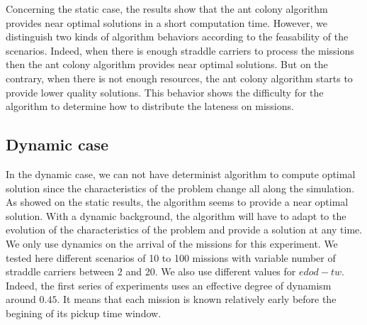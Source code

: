 \documentclass[a4paper,12pt]{article}
\begin{document}
  Concerning the static case, the results show that the ant colony algorithm provides near optimal solutions in a short computation time. However, we distinguish two kinds of algorithm behaviors according to the feasability of the scenarios. Indeed, when there is enough straddle carriers to process the missions then the ant colony algorithm provides near optimal solutions. But on the contrary, when there is not enough resources, the ant colony algorithm starts to provide lower quality solutions. This behavior shows the difficulty for the algorithm to determine how to distribute the lateness on missions.

	\subsection{Dynamic case}
  In the dynamic case, we can not have determinist algorithm to compute optimal solution since the characteristics of the problem change all along the simulation. As showed on the static results, the algorithm seems to provide a near optimal solution. With a dynamic background, the algorithm will have to adapt to the evolution of the characteristics of the problem and provide a solution at any time.\\

  We only use dynamics on the arrival of the missions for this experiment. We tested here different scenarios of 10 to 100 missions with variable number of straddle carriers between 2 and 20. We also use different values for $edod-tw$. Indeed, the first series of experiments uses an effective degree of dynamism around $0.45$. It means that each mission is known relatively early before the begining of its pickup time window.
\end{document}
